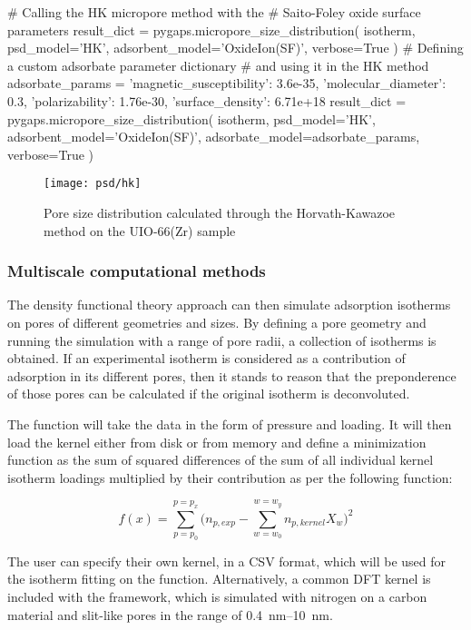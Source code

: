 \begin{python}[float=htb, caption={Using the HK method for PSD},%
    label={pyg:lst:hkpsd}]
# Calling the HK micropore method with the 
# Saito-Foley oxide surface parameters
result_dict = pygaps.micropore_size_distribution(
    isotherm,
    psd_model='HK',
    adsorbent_model='OxideIon(SF)',
    verbose=True
)
# Defining a custom adsorbate parameter dictionary 
# and using it in the HK method
adsorbate_params = {
    'magnetic_susceptibility': 3.6e-35,
    'molecular_diameter': 0.3,
    'polarizability': 1.76e-30,
    'surface_density': 6.71e+18
}
result_dict = pygaps.micropore_size_distribution(
    isotherm,
    psd_model='HK',
    adsorbent_model='OxideIon(SF)',
    adsorbate_model=adsorbate_params,
    verbose=True
)
\end{python}

\begin{figure}[!htb]
	\texttt{[image: psd/hk]}
	\caption{Pore size distribution calculated through the Horvath-Kawazoe method on the UIO-66(Zr) sample}%
	\label{fig:pyg:fig:hk}
\end{figure}

\subsubsection{Multiscale computational methods}

The density functional theory approach can then simulate adsorption
isotherms on pores of different geometries and sizes. By defining 
a pore geometry and running the simulation with a range of 
pore radii, a collection of isotherms is obtained. If an 
experimental isotherm is considered as a contribution of adsorption
in its different pores, then it stands to reason that the preponderence
of those pores can be calculated if the original isotherm is deconvoluted.

The function will take the data in the form of pressure and loading. 
It will then load the kernel either from disk or from memory and define 
a minimization function as the sum of squared differences of the sum of
all individual kernel isotherm loadings multiplied by their contribution 
as per the following function:

\begin{equation}
	f(x) = \sum_{p=p_0}^{p=p_x} \Big(n_{p,exp} - \sum_{w=w_0}^{w=w_y} n_{p, kernel} X_w \Big)^2
\end{equation}

The user can specify their own kernel, in a CSV format, which will be 
used for the isotherm fitting on the 
function. Alternatively, a common DFT kernel is included with the 
framework, which is simulated with nitrogen on a carbon material 
and slit-like pores in the range of \SIrange{0.4}{10}{\nano\meter}.

